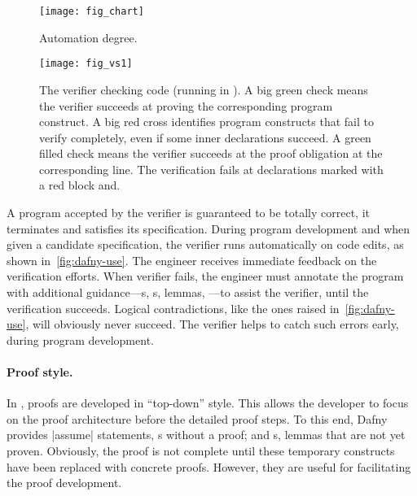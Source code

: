 \begin{figure}[ht]
\centering
\texttt{[image: fig\_chart]}
\caption[Automation degree chart]{Automation degree.}
\label{fig:dafny-auto}
\end{figure}

\begin{figure}[p]
\begin{center}
\texttt{[image: fig\_vs1]}
\end{center}
\caption[Dafny running in Visual Studio Code]{
The  verifier checking  code (running in ). A big green check{ }{ }\circledb[dafnyok]{\faCheck}{ }means the
verifier succeeds at proving the corresponding program construct. A big red
cross{ }{ }\circledb[dafnyno]{\scalebox{1.25}{\faTimes}}{ }identifies program
constructs that fail to verify completely, even if some inner declarations
succeed. A green filled check {\color{dafnyok}{\scalebox{.8}{\faCheckCircle}}}
means the verifier succeeds at the proof obligation at the corresponding line.
The verification fails at declarations marked with a red block
 and\;.
}\label{fig:dafny-use}
\end{figure}

A program accepted by the  verifier is guaranteed to be totally
correct, \ie it terminates and satisfies its
specification. During program development and when given a
candidate specification, the verifier runs automatically on code edits, as shown
in~\autoref{fig:dafny-use}. The engineer receives immediate feedback on the
verification efforts. When  verifier fails, the engineer must
annotate the program with additional guidance---s, s,
lemmas, \etc---to assist the verifier, until the verification succeeds. Logical
contradictions, like the ones raised in~\autoref{fig:dafny-use}, will obviously
never succeed. The verifier helps to catch such errors early, during program
development.

\paragraph*{Proof style.}
In , proofs are developed in \enquote{top-down} style. This allows
the developer to focus on the proof architecture before the detailed proof
steps. To this end, Dafny provides \pr|assume| statements, \ie {}s
without a proof; and s, \ie lemmas that are not yet proven.
Obviously, the proof is not complete until these temporary constructs have been
replaced with concrete proofs. However, they are useful for facilitating the
proof development.


